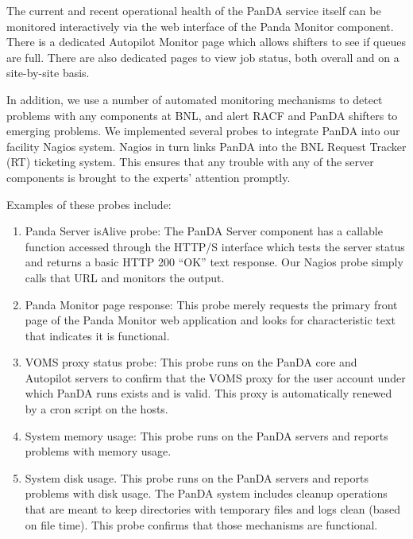 \documentclass[letterpaper]{jpconf}
\begin{document}
The current and recent operational health of the PanDA service itself can be monitored interactively 
via the web interface of the Panda Monitor component. There is a dedicated
Autopilot Monitor page which allows shifters to see if queues are full. There
are also dedicated pages to view job status, both overall and on a site-by-site
basis. 

In addition, we use a number of automated monitoring mechanisms to detect
problems with any components at BNL, and alert RACF and PanDA shifters to
emerging problems. We implemented several probes to integrate PanDA into our facility 
Nagios system. Nagios in turn links PanDA into the BNL Request Tracker (RT)
ticketing system. This ensures that any trouble with any of the server
components is brought to the experts' attention promptly. 

Examples of these probes include:

\begin{enumerate}

\item Panda Server isAlive probe: The PanDA Server component has a callable
function accessed through the HTTP/S interface which tests the server status
and returns a basic HTTP 200 ``OK'' text response. Our Nagios probe simply
calls that URL and monitors the output. 

\item Panda Monitor page response: This probe merely requests the primary front
page of the Panda Monitor web application and looks for characteristic text
that indicates it is functional. 

\item VOMS proxy status probe: This probe runs on the PanDA core and Autopilot
servers to confirm that the VOMS proxy for the user account under which PanDA
runs exists and is valid. This proxy is automatically renewed by a cron script
on the hosts. 

\item System memory usage: This probe runs on the PanDA servers and reports
problems with memory usage. 

\item System disk usage. This probe runs on the PanDA servers and reports
problems with disk usage. The PanDA system includes cleanup operations that are
meant to keep directories with temporary files and logs clean (based on file
time). This probe confirms that those mechanisms are functional. 

\end{enumerate}
\end{document}
